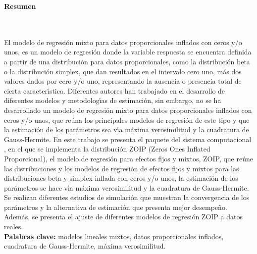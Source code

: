 \newpage
\textbf{\LARGE Resumen}
\\\\
El modelo de regresi\'{o}n mixto para datos proporcionales inflados con ceros y/o unos, es un modelo de regresi\'{o}n donde la variable respuesta se encuentra definida a partir de una distribuci\'{o}n para datos proporcionales, como la distribuci\'{o}n beta o la distribuci\'{o}n simplex, que dan resultados en el intervalo cero uno, m\'{a}s dos valores dados por cero y/o uno, representando la ausencia o presencia total de cierta caracter\'{\i}stica. Diferentes autores han trabajado en el desarrollo de diferentes modelos y metodolog\'{\i}as de estimaci\'{o}n, sin embargo, no se ha desarrollado un modelo de regresi\'{o}n mixto para datos proporcionales inflados con ceros y/o unos, que re\'{u}na los principales modelos de regresi\'{o}n de este tipo y que la estimaci\'{o}n de los par\'{a}metros sea v\'{\i}a m\'{a}xima verosimilitud y la cuadratura de Gauss-Hermite. En este trabajo se presenta el paquete  del sistema computacional , en el que se implementa la distribuci\'{o}n ZOIP (Zeros Ones Inflated Proporcional), el modelo de regresi\'{o}n para efectos fijos y mixtos, ZOIP, que re\'{u}ne las distribuciones y los modelos de regresi\'{o}n de efectos fijos y mixtos para las distribuciones beta y simplex inflada con ceros y/o unos, la estimaci\'{o}n de los par\'{a}metros se hace v\'{\i}a m\'{a}xima verosimilitud y la cuadratura de Gauss-Hermite. Se realizan diferentes estudios de simulaci\'{o}n que muestran la convergencia de los par\'{a}metros y la alternativa de estimaci\'{o}n que presenta mejor desempe\~{n}o. Adem\'{a}s, se presenta el ajuste de diferentes modelos de regresi\'{o}n ZOIP a datos reales.\\

\textbf{\small Palabras clave:} modelos lineales mixtos, datos proporcionales inflados, cuadratura de Gauss-Hermite, m\'{a}xima verosimilitud.\\


